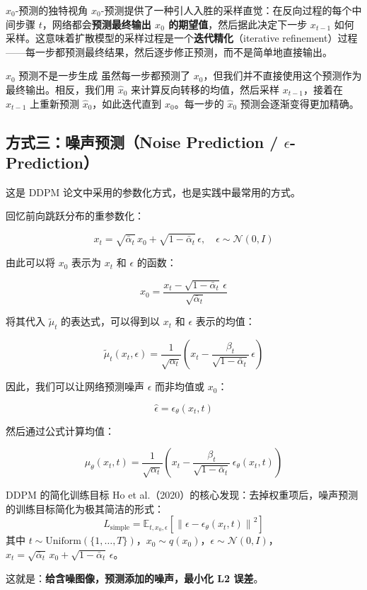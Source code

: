 \begin{importantbox}{$x_0$-预测的独特视角}
$x_0$-预测提供了一种引人入胜的采样直觉：在反向过程的每个中间步骤 $t$，网络都会\textbf{预测最终输出 $x_0$ 的期望值}，然后据此决定下一步 $x_{t-1}$ 如何采样。这意味着扩散模型的采样过程是一个\textbf{迭代精化}（iterative refinement）过程——每一步都预测最终结果，然后逐步修正预测，而不是简单地直接输出。
\end{importantbox}

\begin{warningbox}{$x_0$ 预测不是一步生成}
虽然每一步都预测了 $x_0$，但我们并不直接使用这个预测作为最终输出。相反，我们用 $\hat{x}_0$ 来计算反向转移的均值，然后采样 $x_{t-1}$，接着在 $x_{t-1}$ 上重新预测 $\hat{x}_0$，如此迭代直到 $x_0$。每一步的 $\hat{x}_0$ 预测会逐渐变得更加精确。
\end{warningbox}

\subsection{方式三：噪声预测（Noise Prediction / $\epsilon$-Prediction）}

这是 DDPM 论文中采用的参数化方式，也是实践中最常用的方式。

回忆前向跳跃分布的重参数化：

$$x_t = \sqrt{\bar{\alpha}_t}\, x_0 + \sqrt{1 - \bar{\alpha}_t}\, \epsilon, \quad \epsilon \sim \mathcal{N}(0, I)$$

由此可以将 $x_0$ 表示为 $x_t$ 和 $\epsilon$ 的函数：

$$x_0 = \frac{x_t - \sqrt{1 - \bar{\alpha}_t}\, \epsilon}{\sqrt{\bar{\alpha}_t}}$$

将其代入 $\tilde{\mu}_t$ 的表达式，可以得到以 $x_t$ 和 $\epsilon$ 表示的均值：

$$\tilde{\mu}_t(x_t, \epsilon) = \frac{1}{\sqrt{\alpha_t}}\left(x_t - \frac{\beta_t}{\sqrt{1 - \bar{\alpha}_t}}\, \epsilon\right)$$

因此，我们可以让网络预测噪声 $\epsilon$ 而非均值或 $x_0$：

$$\hat{\epsilon} = \epsilon_\theta(x_t, t)$$

然后通过公式计算均值：

$$\mu_\theta(x_t, t) = \frac{1}{\sqrt{\alpha_t}}\left(x_t - \frac{\beta_t}{\sqrt{1 - \bar{\alpha}_t}}\, \epsilon_\theta(x_t, t)\right)$$

\begin{importantbox}{DDPM 的简化训练目标}
Ho et al.（2020）的核心发现：去掉权重项后，噪声预测的训练目标简化为极其简洁的形式：
$$L_{\text{simple}} = \mathbb{E}_{t, x_0, \epsilon}\left[\left\| \epsilon - \epsilon_\theta(x_t, t) \right\|^2\right]$$
其中 $t \sim \text{Uniform}(\{1, \dots, T\})$，$x_0 \sim q(x_0)$，$\epsilon \sim \mathcal{N}(0, I)$，$x_t = \sqrt{\bar{\alpha}_t}\, x_0 + \sqrt{1 - \bar{\alpha}_t}\, \epsilon$。

这就是：\textbf{给含噪图像，预测添加的噪声，最小化 L2 误差}。
\end{importantbox}

